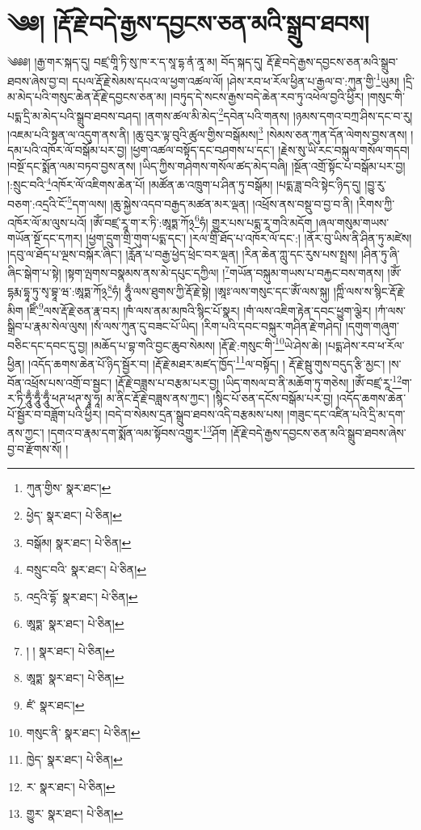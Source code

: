 \setcounter{footnote}{0} 
\chapter{༄༅། །རྡོ་རྗེ་བདེ་རྒྱས་དབྱངས་ཅན་མའི་སྒྲུབ་ཐབས།}༄༅༅། །རྒྱ་གར་སྐད་དུ། བཛྲ་གཱི་ཏི་སུ་ཁ་ར་ད་སཱ་དྷ་ནཾ་ནཱ་མ། བོད་སྐད་དུ། རྡོ་རྗེ་བདེ་རྒྱས་དབྱངས་ཅན་མའི་སྒྲུབ་ཐབས་ཞེས་བྱ་བ། དཔལ་རྡོ་རྗེ་སེམས་དཔའ་ལ་ཕྱག་འཚལ་ལོ། །ཤེས་རབ་ཕ་རོལ་ཕྱིན་པ་རྒྱལ་བ་:ཀུན་གྱི་\footnote{ཀུན་གྱིས་  སྣར་ཐང་། }ཡུམ། །དྲི་མ་མེད་པའི་གསུང་ཆེན་རྡོ་རྗེ་དབྱངས་ཅན་མ། །བཏུད་དེ་སངས་རྒྱས་བདེ་ཆེན་རབ་ཏུ་འཕེལ་བྱའི་ཕྱིར། །གསུང་གི་པདྨ་དྲི་མ་མེད་པའི་སྒྲུབ་ཐབས་བཤད། །ནགས་ཚལ་མི་མེད་\footnote{ཕྱེད་  སྣར་ཐང་།  པེ་ཅིན། }དབེན་པའི་གནས། །ཉམས་དགའ་བཀྲ་ཤིས་དང་བ་རུ། །འཇམ་པའི་སྟན་ལ་འདུག་ནས་ནི། །ཆུ་བུར་ལྟ་བུའི་ཚུལ་གྱིས་བསྒོམས།\footnote{བསྒོམ།  སྣར་ཐང་།  པེ་ཅིན། } །སེམས་ཅན་ཀུན་དོན་ལེགས་བྱས་ནས། །དམ་པའི་འཁོར་ལོ་བསྒོམ་པར་བྱ། །ཕྱག་འཚལ་བསྟོད་དང་བཤགས་པ་དང་། །རྗེས་སུ་ཡི་རང་བསྐུལ་གསོལ་གདབ། །བསྔོ་དང་སྨོན་ལམ་བཏབ་བྱས་ནས། །ཡིད་ཀྱིས་གཤེགས་གསོལ་ཚད་མེད་བཞི། །སྔོན་འགྲོ་སྟོང་པ་བསྒོམ་པར་བྱ། །:སྲུང་བའི་\footnote{བསྲུང་བའི་  སྣར་ཐང་།  པེ་ཅིན། }འཁོར་ལོ་འཇིགས་ཆེན་པོ། །མཚོན་ཆ་འཁྲུག་པ་ཤིན་ཏུ་བསྒོམ། །པདྨ་ཟླ་བའི་སྟེང་ཉིད་དུ། །བྱུ་རུ་བཅག་:འདྲའི་ངོ་\footnote{འདྲའི་དྷོ་  སྣར་ཐང་།  པེ་ཅིན། }དག་ལས། །ཆུ་སྐྱེས་འདབ་བརྒྱད་མཚན་མར་ལྡན། །འཕྲོས་ནས་བསྡུ་བ་བྱ་བ་ནི། །རིགས་ཀྱི་འཁོར་ལོ་མ་ལུས་པའོ། །ཨོཾ་བཛྲ་རཱ་ག་ར་ཏི་:ཨཱཏྨ་ཀོ྅\footnote{ཨཱཏྨ་  སྣར་ཐང་།  པེ་ཅིན། }ཧཾ། གྱུར་པས་པདྨ་རཱ་གའི་མདོག །ཞལ་གསུམ་གཡས་གཡོན་སྔོ་དང་དཀར། །ཕྱག་དྲུག་གྲི་གུག་པདྨ་དང་། །རལ་གྲི་ཐོད་པ་འཁོར་ལོ་དང་:། །ནོར་བུ་ཡིས་ནི་ཤིན་ཏུ་མཛེས། །དབུ་ལ་ཐོད་པ་ལྔས་བསྐོར་ཞིང་། །རློན་པ་བརྒྱ་ཕྱེད་ཕྲེང་བར་ལྡན། །རིན་ཆེན་ཀླུ་དང་རུས་པས་སྤྲས། །ཤིན་ཏུ་ཞི་ཞིང་སྒེག་པ་སྟེ། །སྟག་ལྤགས་བསྣམས་ནས་མེ་དཔུང་དཀྱིལ། །\footnote{། །  སྣར་ཐང་།  པེ་ཅིན། }གཡོན་བསྐུམ་གཡས་པ་བརྐྱང་བས་གནས། །ཨོཾ་དྷརྨ་དྷཱ་ཏུ་སྭ་བྷཱ་ཝ་:ཨཱཏྨ་ཀོ྅\footnote{ཨཱཏྨ་  སྣར་ཐང་།  པེ་ཅིན། }ཧཾ། ཧཱུྃ་ལས་ཐུགས་ཀྱི་རྡོ་རྗེ་སྟེ། །ཨཱཿ་ལས་གསུང་དང་ཨོཾ་ལས་སྐུ། །ཀྵིཾ་ལས་ས་སྙིང་རྡོ་རྗེ་མིག །ཛིཾ་\footnote{ཛཾ་  སྣར་ཐང་། }ལས་རྡོ་རྗེ་ཅན་རྣ་བར། །ཁཾ་ལས་ནམ་མཁའི་སྙིང་པོ་སྣར། །གཾ་ལས་འཇིག་རྟེན་དབང་ཕྱུག་ལྕེར། །ཀཾ་ལས་སྒྲིབ་པ་རྣམ་སེལ་ལུས། །སཾ་ལས་ཀུན་དུ་བཟང་པོ་ཡིད། །རིག་པའི་དབང་བསྐུར་གཤིན་རྗེ་གཤེད། །དགུག་གཞུག་བཅིང་དང་དབང་དུ་བྱ། །མཆོད་པ་བྷ་གའི་བྱང་ཆུབ་སེམས། །རྡོ་རྗེ་:གསུང་གི་\footnote{གསུང་ནི་  སྣར་ཐང་།  པེ་ཅིན། }ཡེ་ཤེས་ཆེ། །པདྨ་ཤེས་རབ་ཕ་རོལ་ཕྱིན། །འདོད་ཆགས་ཆེན་པོ་ཉིད་སྦྱོར་བ། །རྡོ་རྗེ་མཐར་མཛད་ཁྱོད་\footnote{ཁྱེད་  སྣར་ཐང་།  པེ་ཅིན། }ལ་བསྟོད། །
རྡོ་རྗེ་སྦུ་གུས་བདུད་རྩི་མྱང་། །ས་བོན་འཕྲོས་པས་འགྲོ་བ་སྦྱང་། །རྡོ་རྗེ་བཟླས་པ་བརྩམ་པར་བྱ། །ཡིད་གསལ་བ་ནི་མཆོག་ཏུ་གཅེས། །ཨོཾ་བཛྲ་རཱ་\footnote{ར་  སྣར་ཐང་།  པེ་ཅིན། }ག་ར་ཏི་ཧཱུྃ་ཧཱུྃ་ཧཱུྃ་ཕཊ་ཕཊ་སྭཱ་ཧཱ། མ་ནིང་རྡོ་རྗེ་བཟླས་ནས་ཀྱང་། །སྙིང་པོ་ཅན་དངོས་བསྒོམ་པར་བྱ། །འདོད་ཆགས་ཆེན་པོ་སྦྱོར་བ་བཟློག་པའི་ཕྱིར། །བདེ་བ་སེམས་དྲན་སྒྲུབ་ཐབས་འདི་བརྩམས་པས། །གཟུང་དང་འཛིན་པའི་དྲི་མ་དག་ནས་ཀྱང་། །དགའ་བ་རྣམ་དག་སྨོན་ལམ་སྟོབས་འགྱུར་\footnote{གྱུར་  སྣར་ཐང་།  པེ་ཅིན། }ཤོག །རྡོ་རྗེ་བདེ་རྒྱས་དབྱངས་ཅན་མའི་སྒྲུབ་ཐབས་ཞེས་བྱ་བ་རྫོགས་སོ། ། 